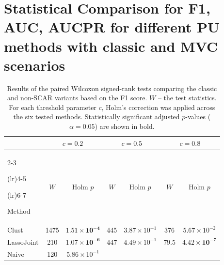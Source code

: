 \documentclass[11pt]{article}
\begin{document}
\section{Statistical Comparison for F1, AUC, AUCPR for different PU methods with classic and MVC scenarios}
\begin{table}[H] 

\caption{Results of the paired Wilcoxon signed-rank tests comparing the classic and non-SCAR variants based on the F1 score. $W$ -- the test statistics. For each threshold parameter $c$, Holm's correction was applied across the six tested methods. Statistically significant adjusted $p$-values ($\alpha=0.05$) are shown in bold.} 

\label{tab:wilcoxon_f1} 

\centering 

\begin{tabular}{lccccc c} 

\toprule 

& \multicolumn{2}{c}{$c=0.2$} 

& \multicolumn{2}{c}{$c=0.5$} 

& \multicolumn{2}{c}{$c=0.8$} \\ 

\cmidrule(lr){2-3} 

\cmidrule(lr){4-5} 

\cmidrule(lr){6-7} 

Method 

& $W$ & Holm $p$ 

& $W$ & Holm $p$ 

& $W$ & Holm $p$ \\ 

\midrule 

Clust 

& 1475  & $\mathbf{1.51\times10^{-4}}$ 

& 445   & $3.87\times10^{-1}$ 

& 376   & $5.67\times10^{-2}$ \\ 

 

LassoJoint 

& 210   & $\mathbf{1.07\times10^{-6}}$ 

& 447   & $4.49\times10^{-1}$ 

& 79.5  & $\mathbf{4.42\times10^{-7}}$ \\ 

 

Naive 

& 120   & $5.86\times10^{-1}$ 


\end{tabular}
\end{table}
\end{document}
